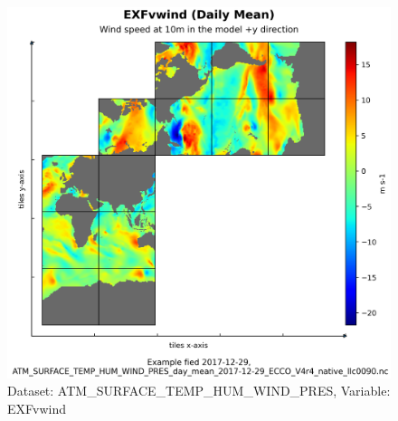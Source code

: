 \begin{figure}[H]
\centering
\includegraphics[scale=0.55]{../images/plots/native_plots/Atmosphere_Surface_Temperature_Humidity_Wind_and_Pressure/EXFvwind.png}
\caption{Dataset: ATM\_SURFACE\_TEMP\_HUM\_WIND\_PRES, Variable: EXFvwind}
\label{tab:table-ATM_SURFACE_TEMP_HUM_WIND_PRES_EXFvwind-Plot}
\end{figure}
\pagebreak
